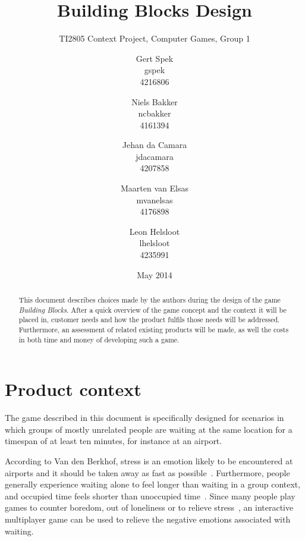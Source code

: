 \documentclass[a4paper,titlepage]{scrartcl}
\title{Building Blocks Design}
\subtitle{TI2805 Context Project, Computer Games, Group 1}
\author{Gert Spek \\ gspek \\ 4216806 \and Niels Bakker \\ ncbakker \\ 4161394 \and Jehan da Camara \\ jdacamara \\ 4207858 \and Maarten van Elsas \\ mvanelsas \\ 4176898 \and Leon Helsloot \\ lhelsloot \\ 4235991}
\date{May 2014}
\begin{document}
\maketitle

\begin{abstract}
This document describes choices made by the authors during the design of the game \textit{Building Blocks}. After a quick overview of the game concept and the context it will be placed in, customer needs and how the product fulfils those needs will be addressed. Furthermore, an assessment of related existing products will be made, as well the costs in both time and money of developing such a game.
\end{abstract}


\tableofcontents



\section{Product context}
The game described in this document is specifically designed for scenarios in which groups of mostly unrelated people are waiting at the same location for a timespan of at least ten minutes, for instance at an airport.

According to Van den Berkhof, stress is an emotion likely to be encountered at airports and it should be taken away as fast as possible~\cite{berkhof}. Furthermore, people generally experience waiting alone to feel longer than waiting in a group context, and occupied time feels shorter than unoccupied time~\cite{maister}. Since many people play games to counter boredom, out of loneliness or to relieve stress~\cite{wack}, an interactive multiplayer game can be used to relieve the negative emotions associated with waiting.


\end{document}
